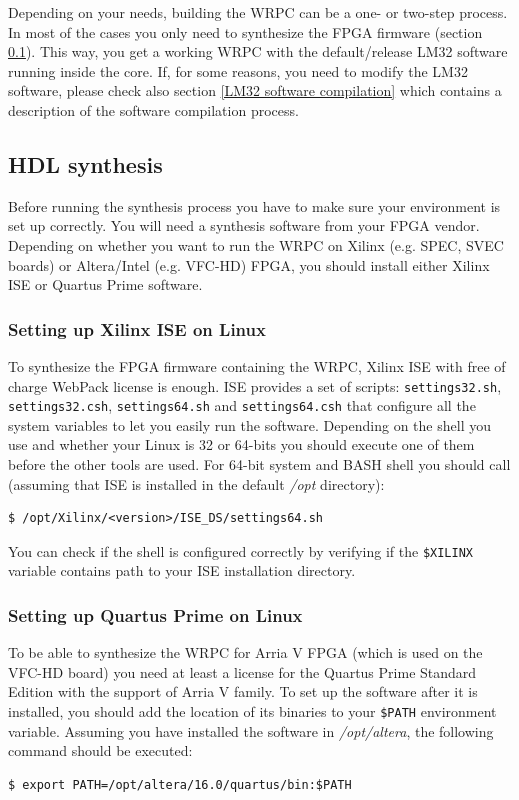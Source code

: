 \documentclass[a4paper, 12pt]{article}
\renewcommand{\_}{\underscore\allowbreak}
\begin{document}
\vspace{1em}
Depending on your needs, building the WRPC can be a one- or two-step process.
In most of the cases you only need to synthesize the FPGA firmware (section
\ref{HDL synthesis}). This way, you get a working WRPC with the default/release
LM32 software running inside the core. If, for some reasons, you need to modify
the LM32 software, please check also section \ref{LM32 software compilation}
which contains a description of the software compilation process.

\subsection{HDL synthesis}
\label{HDL synthesis}

Before running the synthesis process you have to make sure your environment is
set up correctly. You will need a synthesis software from your FPGA vendor.
Depending on whether you want to run the WRPC on Xilinx (e.g. SPEC, SVEC boards) or
Altera/Intel (e.g. VFC-HD) FPGA, you should install either Xilinx ISE or Quartus
Prime software.

\subsubsection{Setting up Xilinx ISE on Linux}
\label{Setting up Xilinx ISE}
To synthesize the FPGA firmware containing the WRPC, Xilinx ISE with free of
charge WebPack license is enough. ISE provides a set of scripts:
\texttt{settings32.sh}, \texttt{settings32.csh}, \texttt{settings64.sh} and
\texttt{settings64.csh} that configure all the system variables to let you
easily run the software. Depending on the shell you use and whether your Linux is
32 or 64-bits you should execute one of them before the other tools are used.
For 64-bit system and BASH shell you should call (assuming that ISE is installed
in the default \textit{/opt} directory):
\begin{lstlisting}
$ /opt/Xilinx/<version>/ISE_DS/settings64.sh
\end{lstlisting}

You can check if the shell is configured correctly by verifying if the
\texttt{\$XILINX} variable contains path to your ISE installation directory.

\subsubsection{Setting up Quartus Prime on Linux}
\label{Setting up Quartus Prime}
To be able to synthesize the WRPC for Arria V FPGA (which is used on the VFC-HD
board) you need at least a license for the Quartus Prime Standard Edition with
the support of Arria V family. To set up the software after it is installed, you
should add the location of its binaries to your \texttt{\$PATH} environment
variable. Assuming you have installed the software in \textit{/opt/altera}, the
following command should be executed:
\begin{lstlisting}
$ export PATH=/opt/altera/16.0/quartus/bin:$PATH
\end{lstlisting}
\end{document}
